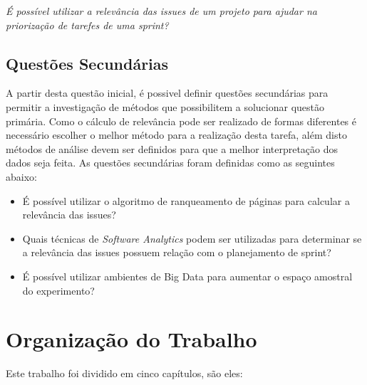 \begin{center}
    \textit{É possível utilizar a relevância das issues de um projeto para ajudar
    na priorização de tarefes de uma sprint?}
\end{center}

\subsection{Questões Secundárias}
\label{int:que:sec}



A partir desta questão inicial, é possivel definir questões secundárias para
permitir  a investigação de métodos que possibilitem a solucionar questão primária.
Como o cálculo de relevância pode ser realizado
de formas diferentes é necessário escolher o melhor método para a realização
desta tarefa, além disto métodos de análise devem ser definidos para que
a melhor interpretação dos dados seja feita. As questões secundárias
foram definidas como as seguintes abaixo:

\begin{itemize}
    \item É possível utilizar o algoritmo de ranqueamento de páginas para calcular a relevância das issues?
    \item Quais técnicas de \textit{Software Analytics} podem ser utilizadas para
        determinar se a relevância das issues possuem relação com o planejamento
        de sprint?
    \item É possível utilizar ambientes de Big Data para aumentar o espaço amostral
        do experimento?
\end{itemize}


\section{Organização do Trabalho}
\label{int:org}
Este trabalho foi dividido em cinco capítulos, são eles:

